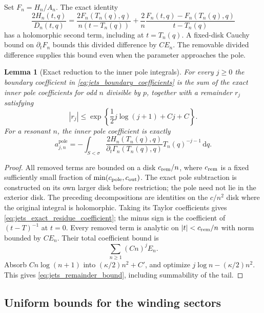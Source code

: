 \documentclass[11pt]{article}
\numberwithin{equation}{section}
\newtheorem{lemma}[theorem]{Lemma}
\theoremstyle{definition}
\newcommand{\dd}{\,\mathrm d}
\begin{document}
Set $F_n=H_n/A_n$. The exact identity
\begin{equation}\label{eq:jets_divided_difference}
 \frac{2H_n(t,q)}{D_n(t,q)}=
 \frac{2F_n(T_n(q),q)}{n(t-T_n(q))}
 +\frac2n\frac{F_n(t,q)-F_n(T_n(q),q)}{t-T_n(q)}
\end{equation}
has a holomorphic second term, including at $t=T_n(q)$. A
fixed-disk Cauchy bound on $\partial_tF_n$ bounds this divided
difference by $CE_n$. The removable divided difference supplies this bound even when the
parameter approaches the pole.

\begin{lemma}[Exact reduction to the inner pole integrals]
\label{lem:jets_remainder}
For every $j\ge0$ the boundary coefficient in
\eqref{eq:jets_boundary_coefficients} is the sum of the exact inner
pole coefficients for odd $n$ divisible by $p$, together with a
remainder $r_j$ satisfying
\begin{equation}\label{eq:jets_remainder_bound}
 |r_j|\le \exp\left\{\frac12j\log(j+1)+Cj+C\right\}.
\end{equation}
For a resonant $n$, the inner pole coefficient is exactly
\begin{equation}\label{eq:jets_exact_residue_coefficient}
 a_{j,n}^{\mathrm{pole}}=
 -\int_{S<\sigma}
  \frac{2H_n(T_n(q),q)}{\partial_t\Gamma_n(T_n(q),q)}
  T_n(q)^{-j-1}\dd q.
\end{equation}
\end{lemma}

\begin{proof}
All removed terms are bounded on a disk $c_{\rm rem}/n$, where
$c_{\rm rem}$ is a fixed sufficiently small fraction of
$\min(c_{\rm pole},c_{\rm out})$. The exact pole subtraction is
constructed on its own larger disk before restriction; the pole need
not lie in the exterior disk. The preceding decompositions are identities on the $c/n^2$ disk
where the original integral is holomorphic. Taking its Taylor
coefficients gives \eqref{eq:jets_exact_residue_coefficient}; the
minus sign is the coefficient of $(t-T)^{-1}$ at $t=0$. Every
removed term is analytic on $|t|<c_{\rm rem}/n$ with norm bounded by $CE_n$.
Their total coefficient bound is
\[
 \sum_{n\ge1}(Cn)^j E_n.
\]
Absorb $Cn\log(n+1)$ into $(\kappa/2)n^2+C'$, and optimize
$j\log n-(\kappa/2)n^2$. This gives
\eqref{eq:jets_remainder_bound}, including summability of the tail.
\end{proof}

\subsection{Uniform bounds for the winding sectors}
\end{document}
